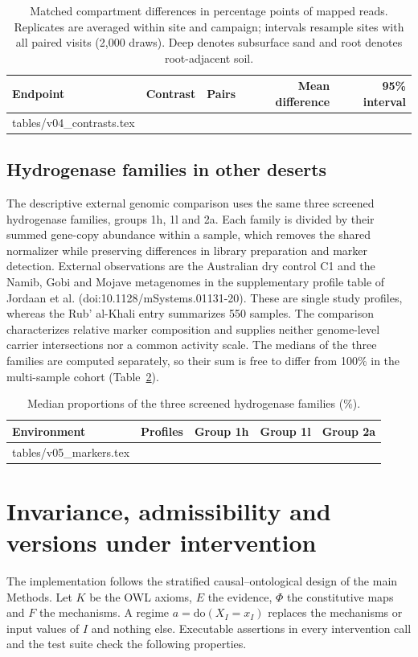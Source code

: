 \documentclass[11pt,a4paper]{article}
\makeatletter
\newcommand{\ContrastRows}{\@@input tables/v04_contrasts.tex }
\newcommand{\MarkerRows}{\@@input tables/v05_markers.tex }
\makeatother
\begin{document}
\begin{table}[ht]
\centering\small
\caption{Matched compartment differences in percentage points of mapped reads. Replicates are averaged within site and campaign; intervals resample sites with all paired visits (2,000 draws). Deep denotes subsurface sand and root denotes root-adjacent soil.}
\label{tab:contrasts}
\begin{tabular}{llrrr}\toprule
Endpoint & Contrast & Pairs & Mean difference & 95\% interval\\\midrule
\ContrastRows
\bottomrule\end{tabular}
\end{table}

\subsection{Hydrogenase families in other deserts}
The descriptive external genomic comparison uses the same three screened hydrogenase families, groups 1h, 1l and 2a. Each family is divided by their summed gene-copy abundance within a sample, which removes the shared normalizer while preserving differences in library preparation and marker detection. External observations are the Australian dry control C1 and the Namib, Gobi and Mojave metagenomes in the supplementary profile table of Jordaan et al. (doi:10.1128/mSystems.01131-20). These are single study profiles, whereas the Rub' al-Khali entry summarizes 550 samples. The comparison characterizes relative marker composition and supplies neither genome-level carrier intersections nor a common activity scale. The medians of the three families are computed separately, so their sum is free to differ from 100\% in the multi-sample cohort (Table~\ref{tab:markers}).
\begin{table}[ht]\centering\small
\caption{Median proportions of the three screened hydrogenase families (\%).}\label{tab:markers}\begin{tabular}{lrrrr}\toprule
Environment & Profiles & Group 1h & Group 1l & Group 2a\\\midrule
\MarkerRows
\bottomrule\end{tabular}\end{table}

\section{Invariance, admissibility and versions under intervention}\label{sec:invariance}
The implementation follows the stratified causal--ontological design of the main Methods. Let $K$ be the OWL axioms, $E$ the evidence, $\Phi$ the constitutive maps and $F$ the mechanisms. A regime $a=\mathrm{do}(X_I=x_I)$ replaces the mechanisms or input values of $I$ and nothing else. Executable assertions in every intervention call and the test suite check the following properties.
\end{document}
